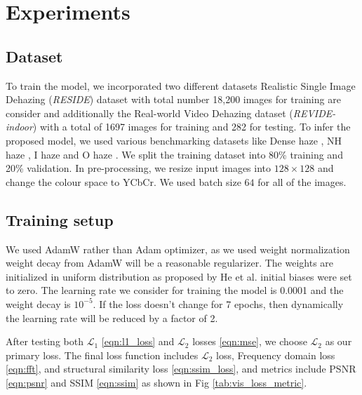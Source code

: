 \section{Experiments}
\label{experiments}


\subsection{Dataset}\label{dataset}
To train the model, we incorporated two different datasets Realistic Single Image Dehazing (\textit{RESIDE}) dataset \cite{bench} with  total number 18,200  images for training are consider and additionally the Real-world Video Dehazing dataset (\textit{REVIDE-indoor}) \cite{revid} with a total of 1697  images for training and 282 for testing. To infer the proposed model, we used various benchmarking datasets like Dense haze \cite{dense_haze}, NH haze \cite{nh_haze}, I haze \cite{i_haze} and O haze \cite{o_haze}. We split the training dataset into 80\% training and 20\% validation. In pre-processing, we resize input images into $128 \times 128$ and change the colour space to YCbCr. We used batch size $64$ for all of the images. 

\subsection{Training setup}\label{train_setup}

We used AdamW \cite{admw} rather than Adam optimizer, as we used weight normalization weight decay from AdamW will be a reasonable regularizer. The weights are initialized in uniform distribution as proposed by He et al. \cite{kaiming} initial biases were set to zero. The learning rate we consider for training the model is 0.0001 and the weight decay is $10^{-5}$. If the loss doesn't change for 7 epochs, then dynamically the learning rate will be reduced by a factor of 2.

After testing both $\mathcal{L}_1$ \eqref{eqn:l1_loss} and $\mathcal{L}_2$ losses \eqref{eqn:mse}, we choose $\mathcal{L}_2$ as our primary loss. The final loss function includes $\mathcal{L}_2$ loss, Frequency domain loss \eqref{eqn:fft}, and structural similarity loss \eqref{eqn:ssim_loss}, and metrics include PSNR \eqref{eqn:psnr} and SSIM \eqref{eqn:ssim} as shown in Fig  \eqref{tab:vis_loss_metric}.

